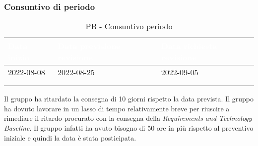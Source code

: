 {            \subsubsection{Consuntivo di periodo} {
                \setlength{\freewidth}{\dimexpr\textwidth-30\tabcolsep}
                \renewcommand{\arraystretch}{1.0}
                \setlength{\aboverulesep}{0pt}
                \setlength{\belowrulesep}{0pt}
                \begin{longtable}{C{.4\freewidth} C{.4\freewidth} C{.4\freewidth}}
                \toprule
                \textcolor{white}{\textbf{Data inizio}}&
                \textcolor{white}{\textbf{Data previsione revisione}}&
                \textcolor{white}{\textbf{Data richiesta revisione}} \\
                \toprule
                \endhead
                    
                2022-08-08 & 2022-08-25 & 2022-09-05 \\
                \\
                \caption{PB - Consuntivo periodo}
          
                \end{longtable}
                Il gruppo ha ritardato la consegna di 10 giorni rispetto la data prevista. Il gruppo ha dovuto lavorare in un lasso di tempo relativamente breve per riuscire a rimediare il ritardo 
                procurato con la consegna della \textit{Requirements and Technology Baseline}. Il gruppo infatti ha avuto bisogno di 50 ore in più rispetto al preventivo iniziale e quindi la data è stata posticipata.
                }
        
 }
